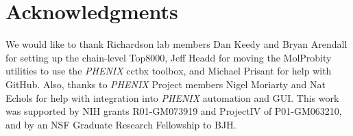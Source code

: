 \section{Acknowledgments}
We would like to thank Richardson lab members Dan Keedy and Bryan Arendall for setting up the chain-level Top8000, Jeff Headd for moving the MolProbity utilities to use the \textit{PHENIX} cctbx toolbox, and Michael Prisant for help with GitHub. Also, thanks to \textit{PHENIX} Project members Nigel Moriarty and Nat Echols for help with integration into \textit{PHENIX} automation and GUI. This work was supported by NIH grants R01-GM073919 and ProjectIV of P01-GM063210, and by an NSF Graduate Research Fellowship to BJH.
